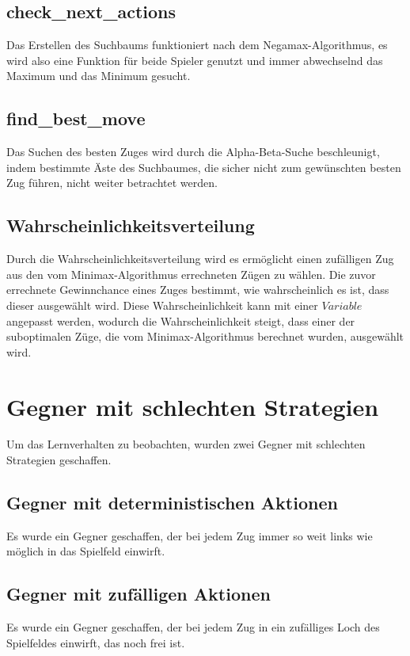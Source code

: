 \subsection{check\_next\_actions}
Das Erstellen des Suchbaums funktioniert nach dem Negamax-Algorithmus, es wird also eine Funktion für beide Spieler genutzt und immer abwechselnd das Maximum und das Minimum gesucht.

\subsection{find\_best\_move}
Das Suchen des besten Zuges wird durch die Alpha-Beta-Suche beschleunigt, indem bestimmte Äste des Suchbaumes, die sicher nicht zum gewünschten besten Zug führen, nicht weiter betrachtet werden.

\subsection{Wahrscheinlichkeitsverteilung}
Durch die Wahrscheinlichkeitsverteilung wird es ermöglicht einen zufälligen Zug aus den vom Minimax-Algorithmus errechneten Zügen zu wählen. Die zuvor errechnete Gewinnchance eines Zuges bestimmt, wie wahrscheinlich es ist, dass dieser ausgewählt wird. Diese Wahrscheinlichkeit kann mit einer $Variable$ angepasst werden, wodurch die  Wahrscheinlichkeit steigt, dass einer der suboptimalen Züge, die vom Minimax-Algorithmus berechnet wurden, ausgewählt wird. 

\section{Gegner mit schlechten Strategien}
Um das Lernverhalten zu beobachten, wurden zwei Gegner mit schlechten Strategien geschaffen.

\subsection{Gegner mit deterministischen Aktionen}
Es wurde ein Gegner geschaffen, der bei jedem Zug immer so weit links wie möglich in das Spielfeld einwirft. 

\subsection{Gegner mit zufälligen Aktionen}
Es wurde ein Gegner geschaffen, der bei jedem Zug in ein zufälliges Loch des Spielfeldes einwirft, das noch frei ist.


